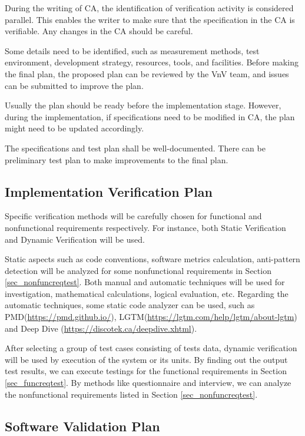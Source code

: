 \documentclass[12pt, titlepage]{article}
\begin{document}
During the writing of CA, the identification of verification activity is considered parallel. This enables the writer to make sure that the specification in the CA is verifiable. Any changes in the CA should be careful.

Some details need to be identified, such as measurement methods, test environment, development strategy, resources, tools, and facilities. Before making the final plan, the proposed plan can be reviewed by the VnV team, and issues can be submitted to improve the plan.

Usually the plan should be ready before the implementation stage. However, during the implementation, if specifications need to be modified in CA, the plan might need to be updated accordingly.

The specifications and test plan shall be well-documented. There can be preliminary test plan to make improvements to the final plan.

\subsection{Implementation Verification Plan}
    Specific verification methods will be carefully chosen for functional and nonfunctional requirements respectively. For instance, both Static Verification and Dynamic Verification will be used. 
    
    Static aspects such as code conventions, software metrics calculation, anti-pattern detection will be analyzed for some nonfunctional requirements in Section \ref{sec_nonfuncreqtest}. Both manual and automatic techniques will be used for investigation, mathematical calculations, logical evaluation, etc. Regarding the automatic techniques, some static code analyzer can be used, such as PMD(\url{https://pmd.github.io/}), LGTM(\url{https://lgtm.com/help/lgtm/about-lgtm}) and Deep Dive (\url{https://discotek.ca/deepdive.xhtml}).
    
    After selecting a group of test cases consisting of tests data, dynamic verification will be used by execution of the system or its units. By finding out the output test results, we can execute testings for the functional requirements in Section \ref{sec_funcreqtest}. By methods like questionnaire and interview, we can analyze the nonfunctional requirements listed in Section \ref{sec_nonfuncreqtest}.
        
\subsection{Software Validation Plan}
\end{document}
